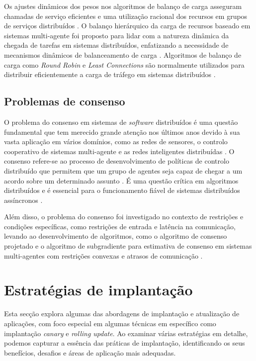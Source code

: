 Os ajustes dinâmicos dos pesos nos algoritmos de balanço de carga asseguram chamadas de serviço 
eficientes e uma utilização racional dos recursos em grupos de serviços distribuídos \cite{lb2022}.
O balanço hierárquico da carga de recursos baseado em sistemas multi-agente foi proposto para 
lidar com a natureza dinâmica da chegada de tarefas em sistemas distribuídos, enfatizando a 
necessidade de mecanismos dinâmicos de balanceamento de carga \cite{lb2018b}. Algoritmos de 
balanço de carga como \textit{Round Robin} e \textit{Least Connections} são normalmente utilizados 
para distribuir eficientemente a carga de tráfego em sistemas distribuídos \cite{lb2010}.

\subsection{Problemas de consenso}

O problema do consenso em sistemas de \textit{software} distribuídos é uma questão fundamental que 
tem merecido grande atenção nos últimos anos devido à sua vasta aplicação em vários domínios, como
as redes de sensores, o controlo cooperativo de sistemas multi-agente e as redes inteligentes 
distribuídas \cite{consensus2020}. O consenso refere-se ao processo de desenvolvimento de políticas 
de controlo distribuído que permitem que um grupo de agentes seja capaz de chegar a um acordo sobre 
um determinado assunto \cite{consensus2013}. É uma questão crítica em algoritmos distribuídos e é
essencial para o funcionamento fiável de sistemas distribuídos assíncronos \cite{consesus2016} 
\cite{consensus2011}.

Além disso, o problema do consenso foi investigado no contexto de restrições e condições
específicas, como restrições de entrada e latência na comunicação, levando ao desenvolvimento de
algoritmos, como o algoritmo de consenso projetado e o algoritmo de subgradiente para estimativa 
de consenso em sistemas multi-agentes com restrições convexas e atrasos de comunicação 
\cite{consensus2018}.

\section{Estratégias de implantação}

Esta secção explora algumas das abordagens de implantação e atualização de aplicações, com foco 
especial em algumas técnicas em específico como implantação \textit{canary} e \textit{rolling update}.
Ao examinar várias estratégias em detalhe, podemos capturar a essência das práticas de implantação, 
identificando os seus benefícios, desafios e áreas de aplicação mais adequadas. 

